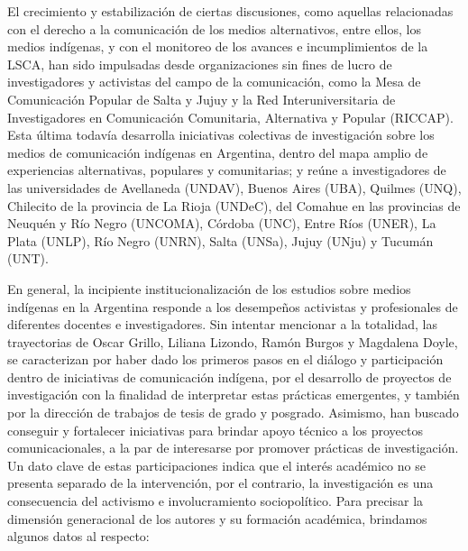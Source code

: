 \documentclass{tufte-handout}
\begin{document}
El crecimiento y estabilización de ciertas discusiones, como aquellas
relacionadas con el derecho a la comunicación de los medios
alternativos, entre ellos, los medios indígenas, y con el monitoreo de
los avances e incumplimientos de la LSCA, han sido impulsadas desde
organizaciones sin fines de lucro de investigadores y activistas del
campo de la comunicación, como la Mesa de Comunicación Popular de Salta
y Jujuy y la Red Interuniversitaria de Investigadores en Comunicación
Comunitaria, Alternativa y Popular (RICCAP). Esta última todavía
desarrolla iniciativas colectivas de investigación sobre los medios de
comunicación indígenas en Argentina, dentro del mapa amplio de
experiencias alternativas, populares y comunitarias; y reúne a
investigadores de las universidades de Avellaneda (UNDAV), Buenos Aires
(UBA), Quilmes (UNQ), Chilecito de la provincia de La Rioja (UNDeC), del
Comahue en las provincias de Neuquén y Río Negro (UNCOMA), Córdoba
(UNC), Entre Ríos (UNER), La Plata (UNLP), Río Negro (UNRN), Salta
(UNSa), Jujuy (UNju) y Tucumán (UNT).

En general, la incipiente institucionalización de los estudios sobre
medios indígenas en la Argentina responde a los desempeños activistas y
profesionales de diferentes docentes e investigadores. Sin intentar
mencionar a la totalidad, las trayectorias de Oscar Grillo, Liliana
Lizondo, Ramón Burgos y Magdalena Doyle, se caracterizan por haber dado
los primeros pasos en el diálogo y participación dentro de iniciativas
de comunicación indígena, por el desarrollo de proyectos de
investigación con la finalidad de interpretar estas prácticas
emergentes, y también por la dirección de trabajos de tesis de grado y
posgrado. Asimismo, han buscado conseguir y fortalecer iniciativas para
brindar apoyo técnico a los proyectos comunicacionales, a la par de
interesarse por promover prácticas de investigación. Un dato clave de
estas participaciones indica que el interés académico no se presenta
separado de la intervención, por el contrario, la investigación es una
consecuencia del activismo e involucramiento sociopolítico. Para
precisar la dimensión generacional de los autores y su formación
académica, brindamos algunos datos al respecto:

\vspace{.2in}
\end{document}
